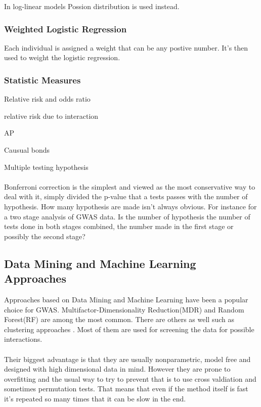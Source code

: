 \documentclass[10pt,a4paper]{article}
\begin{document}
In log-linear models Possion distribution is used instead. \cite{agresti_categorical}

\subsubsection{Weighted Logistic Regression}
Each individual is assigned a weight that can be any postive number. It's then used to weight the logistic regression.

\subsubsection{Statistic Measures}

Relative risk and odds ratio\cite{agresti_categorical}

relative risk due to interaction

AP

Causual bonds

Multiple testing hypothesis \cite{bonferroni_multiple}\\
\\
Bonferroni correction is the simplest and viewed as the most conservative way to deal with it, simply divided the p-value that a tests passes with the number of hypothesis. How many hypothesis are made isn't always obvious. For instance for a two stage analysis of GWAS data. Is the number of hypothesis the number of tests done in both stages combined, the number made in the first stage or possibly the second stage?\cite{bonferroni_multiple}

\subsection{Data Mining and Machine Learning Approaches}
\label{data_machine_learning}
Approaches based on Data Mining and Machine Learning have been a popular choice for GWAS. Multifactor-Dimensionality Reduction(MDR)\cite{mdr_2001} and Random Forest(RF)\cite{random_forest} are among the most common\cite{gene_enviroment_2013,cordell_detect_review}. There are others as well such as clustering approaches \cite{fast_high_order_cluster}. Most of them are used for screening the data for possible interactions\cite{gene_enviroment_2013,cordell_detect_review}.\\
\\
Their biggest advantage is that they are usually nonparametric, model free and designed with high dimensional data in mind. However they are prone to overfitting and the usual way to try to prevent that is to use cross valdiation and sometimes permutation tests. That means that even if the method itself is fast it's repeated so many times that it can be slow in the end.\cite{cordell_detect_review}
\end{document}
